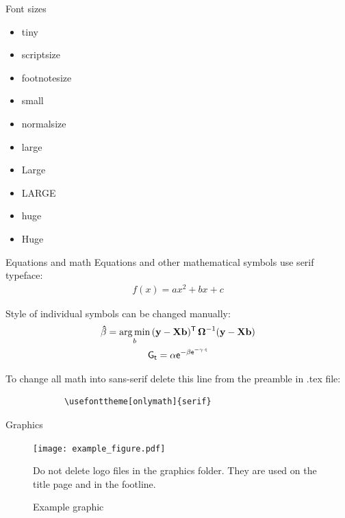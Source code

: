 \documentclass[11pt,t]{beamer}
\begin{document}
	\begin{frame}{Font sizes}
		\begin{itemize}
			\item \tiny tiny
			\item \scriptsize scriptsize
			\item \footnotesize footnotesize
			\item \small small
			\item \normalsize normalsize
			\item \large large
			\item \Large Large
			\item \LARGE LARGE
			\item \huge huge
			\item \Huge Huge
		\end{itemize}
	\end{frame}




	\begin{frame}[fragile]{Equations and math}   %
		Equations and other mathematical symbols use serif typeface:
		\begin{gather*}
			f(x)= a x^2 + b x + c
		\end{gather*}

		Style of individual symbols can be changed manually:
		\begin{gather*}
			\mathbf{\hat{\beta}} = \underset{b}{\rm arg\,min}\,(\mathbf{y}- \mathbf{X} \mathbf{b})^{\mathsf{T}}\,\boldsymbol{\Omega}^{-1}(\mathbf{y}- \mathbf{X} \mathbf{b}) \\
			\mathsf{    G_t = \alpha e^{-\beta e^{-\gamma \cdot t}}    }
		\end{gather*}

		To change all math into sans-serif delete this line from the preamble in .tex file:
		\begin{verbatim}
			\usefonttheme[onlymath]{serif}
		\end{verbatim}
	\end{frame}




	\begin{frame}{Graphics}
		\vspace{-12pt}
		\begin{figure}
			\centering
			\texttt{[image: example\_figure.pdf]}
			\caption{Example graphic \label{fig:figure1}}
			\footnotesize
			\flushleft
			Do not delete logo files in the graphics folder. They are used on the title page and in the footline.
		\end{figure}
	\end{frame}
\end{document}
